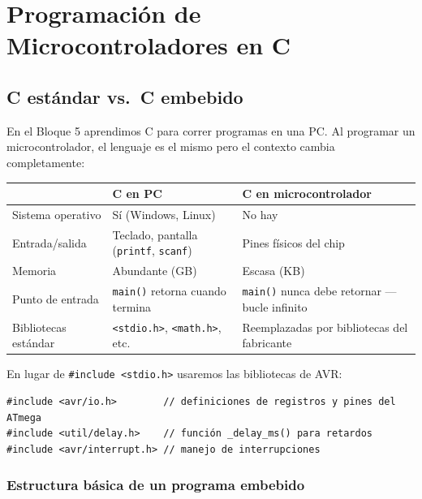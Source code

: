 \chapter{Programación de Microcontroladores en C}

\section{C estándar vs.\ C embebido}

En el Bloque 5 aprendimos C para correr programas en una PC. Al programar un
microcontrolador, el lenguaje es el mismo pero el contexto cambia completamente:

\begin{table}[H]
\centering
\begin{tabularx}{\textwidth}{>{\raggedright\arraybackslash}p{3.3cm}
    >{\raggedright\arraybackslash}X >{\raggedright\arraybackslash}X}
\toprule
 & \textbf{C en PC} & \textbf{C en microcontrolador} \\
\midrule
Sistema operativo & Sí (Windows, Linux) & No hay \\
Entrada/salida & Teclado, pantalla (\texttt{printf}, \texttt{scanf}) & Pines físicos del chip \\
Memoria & Abundante (GB) & Escasa (KB) \\
Punto de entrada & \texttt{main()} retorna cuando termina & \texttt{main()} nunca debe retornar --- bucle infinito \\
Bibliotecas estándar & \texttt{<stdio.h>}, \texttt{<math.h>}, etc. & Reemplazadas por bibliotecas del fabricante \\
\bottomrule
\end{tabularx}
\end{table}

En lugar de \texttt{\#include <stdio.h>} usaremos las bibliotecas de AVR:

\begin{lstlisting}[style=estilo-c]
#include <avr/io.h>        // definiciones de registros y pines del ATmega
#include <util/delay.h>    // función _delay_ms() para retardos
#include <avr/interrupt.h> // manejo de interrupciones
\end{lstlisting}

\subsection{Estructura básica de un programa embebido}

